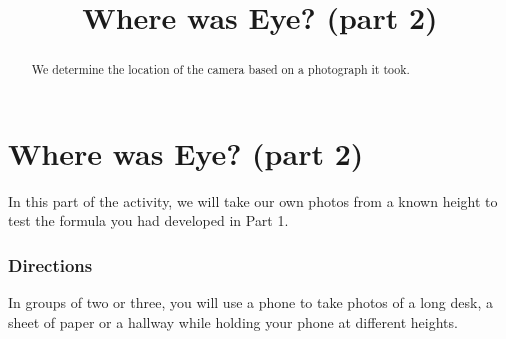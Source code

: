\documentclass{ximera}
\title{Where was Eye? (part 2)} \license{CC BY-NC-SA 4.0}
\begin{document}
\begin{abstract}
We determine the location of the camera based on a photograph it took.
\end{abstract}
\maketitle

\section*{Where was Eye? (part 2)}


In this part of the activity, we will take our own photos from a known height to test the formula you had developed in Part 1.  

\subsubsection*{Directions}
In groups of two or three, you will use a phone to take photos of a long desk, a sheet of paper or a hallway while holding your phone at different heights.
\end{document}
